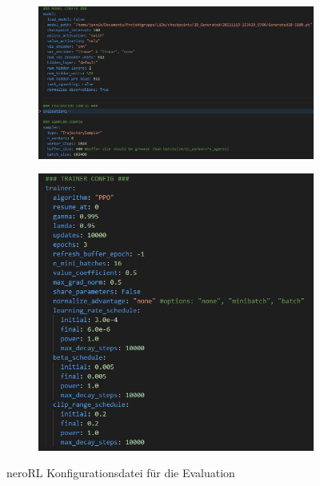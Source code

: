 \begin{figure}
	\centering
	\begin{subfigure}[b]{0.4\textwidth}
		\centering
		\includegraphics[width=\textwidth]{resources/img/konfig_1.png}
	\end{subfigure}
	\hfill
	\begin{subfigure}[b]{0.4\textwidth}
		\centering
		\includegraphics[width=\textwidth]{resources/img/konfig_2.png}
	\end{subfigure}
    \caption{neroRL Konfigurationsdatei für die Evaluation}\label{fig:evaluation_config}
\end{figure}

